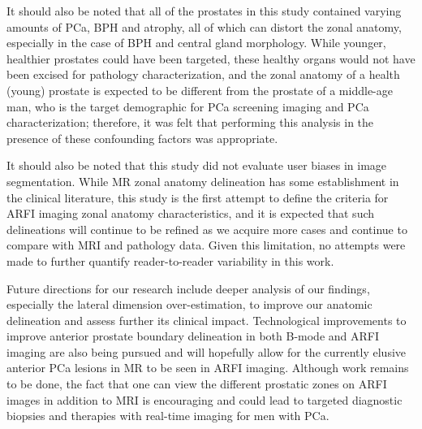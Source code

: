 It should also be noted that all of the prostates in this study contained
varying amounts of PCa, BPH and atrophy, all of which can distort the zonal
anatomy, especially in the case of BPH and central gland morphology.  While
younger, healthier prostates could have been targeted, these healthy organs
would not have been excised for pathology characterization, and the zonal
anatomy of a health (young) prostate is expected to be different from the
prostate of a middle-age man, who is the target demographic for PCa screening
imaging and PCa characterization; therefore, it was felt that performing this
analysis in the presence of these confounding factors was appropriate.

It should also be noted that this study did not evaluate user biases in image
segmentation.  While MR zonal anatomy delineation has some establishment in the
clinical literature, this study is the first attempt to define the criteria for
ARFI imaging zonal anatomy characteristics, and it is expected that such
delineations will continue to be refined as we acquire more cases and continue
to compare with MRI and pathology data.  Given this limitation, no attempts
were made to further quantify reader-to-reader variability in this work.

Future directions for our research include deeper analysis of our findings,
especially the lateral dimension over-estimation, to improve our anatomic
delineation and assess further its clinical impact.  Technological improvements
to improve anterior prostate boundary delineation in both B-mode and ARFI
imaging are also being pursued and will hopefully allow for the currently
elusive anterior PCa lesions in MR to be seen in ARFI imaging.  Although work
remains to be done, the fact that one can view the different prostatic zones on
ARFI images in addition to MRI is encouraging and could lead to targeted
diagnostic biopsies and therapies with real-time imaging for men with PCa. 
